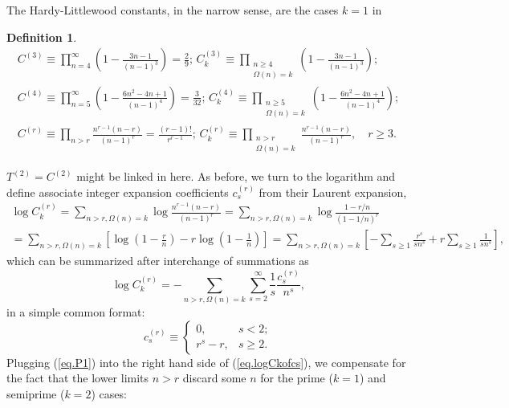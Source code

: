 \documentclass{amsart}
\newtheorem{defn}{Definition}
\begin{document}
The Hardy-Littlewood constants, in the narrow sense, are the cases $k=1$ in
\begin{defn}\label{def.HL}
\begin{gather}
C^{(3)}\equiv \prod_{n=4}^\infty \left(1-\frac{3n-1}{(n-1)^3}\right)=\frac{2}{9} 
;\,
C_k^{(3)}\equiv \prod_{\substack{n\ge 4\\ \Omega(n)=k}} \left(1-\frac{3n-1}{(n-1)^3}\right)
;
\label{eq.HL3}
\\
C^{(4)}\equiv \prod_{n=5}^\infty \left(1-\frac{6n^2-4n+1}{(n-1)^4}\right)=\frac{3}{32}
;\,
C_k^{(4)}\equiv \prod_{\substack{n\ge 5\\ \Omega(n)=k}} \left(1-\frac{6n^2-4n+1}{(n-1)^4}\right)
;
\\
C^{(r)}\equiv \prod_{n>r} \frac{n^{r-1}(n-r)}{(n-1)^r}
=\frac{(r-1)!}{r^{r-1}}
;\,
C_k^{(r)}\equiv \prod_{\substack{n>r\\ \Omega(n)=k}}
\frac{n^{r-1}(n-r)}{(n-1)^r},\quad r\ge 3
\label{eq.HL5}
.
\end{gather}
\end{defn}
$T^{(2)}=C^{(2)}$ might be linked in here.
As before, we turn to the logarithm and define associate integer expansion
coefficients $c_s^{(r)}$ from their Laurent expansion,
\begin{gather}
\log C_k^{(r)}
=
\sum_{n> r,\Omega(n)=k}
\log\frac{n^{r-1}(n-r)}{(n-1)^r}
=
\sum_{n> r,\Omega(n)=k}
\log\frac{1-r/n}{(1-1/n)^r}
\\
=
\sum_{n> r,\Omega(n)=k}
\left[
\log\left(1-\frac{r}{n}\right)-r\log\left (1-\frac{1}{n}\right)
\right]
=
\sum_{n> r,\Omega(n)=k}
\left[
-\sum_{s\ge 1}\frac{r^s}{sn^s}+r\sum_{s\ge 1}\frac{1}{sn^s}
\right]
\nonumber
,
\end{gather}
which can be summarized after interchange of summations as
\begin{equation}
\log C_k^{(r)} =
-
\sum_{n> r,\Omega(n)=k}
\sum_{s=2}^\infty \frac{1}{s}\frac{c_s^{(r)}}{n^s},
\label{eq.logCkofcs}
\end{equation}
in a simple common format:
\begin{equation}
c^{(r)}_s\equiv \left\{
\begin{array}{ll}
0,& s<2; \\
r^s-r,& s\ge 2.
\end{array}
\right.
\end{equation}
Plugging (\ref{eq.P1}) into the right hand side of (\ref{eq.logCkofcs}),
we compensate for the fact that
the lower limits $n> r$ discard some $n$
for the prime ($k=1$) and semiprime ($k=2$) cases:
\end{document}
